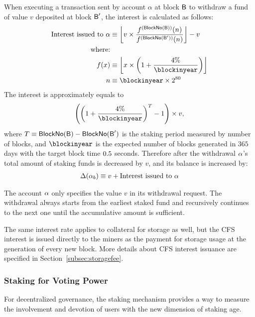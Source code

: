 When executing a transaction sent by account $\alpha$ at block $\textsf{B}$ to withdraw a fund of value $v$ deposited at block $\textsf{B}'$,
the interest is calculated as follows:
\begin{align}
	\text{Interest issued to $\account$} 
	&\eqdef \left\lfloor v \times \frac{f^{(\blockno(\block))}(n)}{f^{(\blockno(\block'))}(n)} \right\rfloor- v \\ 
	\mbox{where:}& \\
	f(x) &\eqdef \left\lfloor x \times \left(1+\frac{\interest}{\blockinyear}\right)\right\rfloor \\
	n &\eqdef \blockinyear \times 2^{80}
\end{align}
The interest is approximately equals to 
\begin{align}
	\left(\left(1+\frac{\interest}{\blockinyear}\right)^T-1\right)\times v, 
\end{align}
where $T\equiv\mathsf{BlockNo}(\textsf{B}) - \mathsf{BlockNo}(\textsf{B}')$ is the staking period measured by number of blocks, 
and $\blockinyear$ is the expected number of blocks generated in $365$ days with the target block time $0.5$ seconds.
% 
Therefore after the withdrawal $\mathbf{\alpha}$'s total amount of staking funds is decreased by $v$,
and its balance is increased by:
\begin{align}
	\Delta(\mathbf{\alpha}_b) \equiv v + \text{Interest issued to $\mathbf{\alpha}$} 
\end{align}

The account $\mathbf{\alpha}$ only specifies the value $v$ in its withdrawal request. 
The withdrawal always starts from the earliest staked fund and recursively continues to the next one until the accumulative amount is sufficient.

The same interest rate applies to collateral for storage as well, but the CFS interest is issued directly to the miners as the payment for storage usage at the generation of every new block.
More details about CFS interest issuance are specified in Section~\ref{subsec:storagefee}.


\subsubsection{Staking for Voting Power}

For decentralized governance, the staking mechanism provides a way to measure the involvement and devotion of users with the new dimension of staking age.

